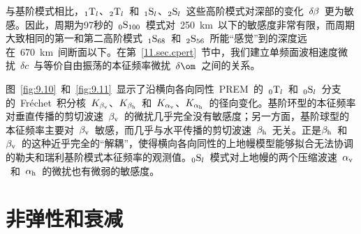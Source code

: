 与基阶模式相比，${}_1{\rm T}_l$、${}_2{\rm T}_l$~和~${}_1{\rm S}_l$、${}_2{\rm S}_l$~这些高阶模式对深部的变化~$\delta\hspace{-0.2 mm}\beta$~更为敏感。因此，周期为97秒的~${}_0{\rm S}_{100}$~模式对~250~km~以下的敏感度非常有限，而周期大致相同的第一和第二高阶模式~${}_1{\rm S}_{68}$~和~${}_2{\rm S}_{56}$~所能“感觉”到的深度远在~670~km~间断面以下。在第~\ref{11.sec.cpert}~节中，我们建立单频面波相速度微扰~$\delta c$~与等价自由振荡的本征频率微扰~$\delta\om$~之间的关系。

图~\ref{fig:9.10}~和~\ref{fig:9.11}~显示了沿横向各向同性~PREM~的~${}_0{\rm T}_l$~和~${}_0{\rm S}_l$~分支的~Fr\'{e}chet~积分核~$K_{\beta_{\rm v}}$、$K_{\beta_{\rm h}}$~和~$K_{\alpha_{\rm v}}$、$K_{\alpha_{\rm h}}$~的径向变化。基阶环型的本征频率对垂直传播的剪切波速~$\beta_{\rm v}$~的微扰几乎完全没有敏感度；另一方面，基阶球型的本征频率主要对~$\beta_{\rm v}$~敏感，而几乎与水平传播的剪切波速~$\beta_{\rm h}$~无关。正是$\beta_{\rm h}$~和~$\beta_{\rm v}$~的这种近乎完全的“解耦”，使得横向各向同性的上地幔模型能够拟合无法协调的勒夫和瑞利基阶模式本征频率的观测值。${}_0{\rm S}_l$~模式对上地幔的两个压缩波速~$\alpha_{\rm v}$~和~$\alpha_{\rm h}$~的微扰也有微弱的敏感度。
%
%

\section{非弹性和衰减}
%
%
\label{section:anelas}

